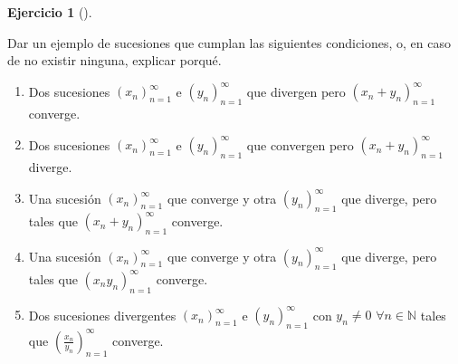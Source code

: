 \documentclass[
  a4paper,
]{scrreport}
\providecommand{\tightlist}{%
  \setlength{\itemsep}{0pt}\setlength{\parskip}{0pt}}\usepackage{longtable,booktabs,array}
\theoremstyle{definition}
\newtheorem{exercise}{Ejercicio}[chapter]
\theoremstyle{remark}
\begin{document}
\leavevmode{}%
\begin{exercise}[]\label{exr-ejemplo-sucesiones-2}

Dar un ejemplo de sucesiones que cumplan las siguientes condiciones, o,
en caso de no existir ninguna, explicar porqué.

\begin{enumerate}
\def\labelenumi{\alph{enumi}.}
\tightlist
\item
  Dos sucesiones \((x_n)_{n=1}^\infty\) e \((y_n)_{n=1}^\infty\) que
  divergen pero \((x_n+y_n)_{n=1}^\infty\) converge.
\item
  Dos sucesiones \((x_n)_{n=1}^\infty\) e \((y_n)_{n=1}^\infty\) que
  convergen pero \((x_n+y_n)_{n=1}^\infty\) diverge.
\item
  Una sucesión \((x_n)_{n=1}^\infty\) que converge y otra
  \((y_n)_{n=1}^\infty\) que diverge, pero tales que
  \((x_n+y_n)_{n=1}^\infty\) converge.
\item
  Una sucesión \((x_n)_{n=1}^\infty\) que converge y otra
  \((y_n)_{n=1}^\infty\) que diverge, pero tales que
  \((x_ny_n)_{n=1}^\infty\) converge.
\item
  Dos sucesiones divergentes \((x_n)_{n=1}^\infty\) e
  \((y_n)_{n=1}^\infty\) con \(y_n\neq 0\) \(\forall n\in\mathbb{N}\)
  tales que \(\left(\frac{x_n}{y_n}\right)_{n=1}^\infty\) converge.
\end{enumerate}

\end{exercise}
\end{document}

